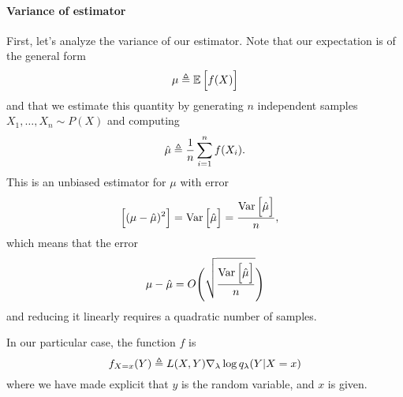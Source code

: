 \paragraph{Variance of estimator} First, let's analyze the variance of our estimator. Note that our expectation is of the general form
\begin{align*}
  \mu \triangleq \operatorname{\mathbb{E}} \Big[ f(X) \Big]
\end{align*}
and that we estimate this quantity by generating $n$ independent samples $X_1,\dots,X_n \sim P(X)$ and computing
\begin{align*}
  \hat{\mu} \triangleq \frac{1}{n} \sum_{i=1}^n f(X_i).
\end{align*}
This is an unbiased estimator for $\mu$ with error
\begin{align*}
  \Big[(\mu - \hat{\mu})^2 \Big] &= \operatorname{Var} \Big[ \hat{\mu} \Big] = \frac{\operatorname{Var} \Big[ \hat{\mu} \Big]}{n},
\end{align*}
which means that the error
\begin{align*}
  \mu - \hat{\mu} = O \Bigg( \sqrt{\frac{\operatorname{Var} \Big[ \hat{\mu} \Big] }{n}} \Bigg)
\end{align*}
and reducing it linearly requires a quadratic number of samples.

In our particular case, the function $f$ is
\begin{equation*}
  f_{X=x}(Y) \triangleq L(X,Y) \nabla_{\lambda} \log q_{\lambda}(Y|X=x)
\end{equation*}
where we have made explicit that $y$ is the random variable, and $x$ is given.

